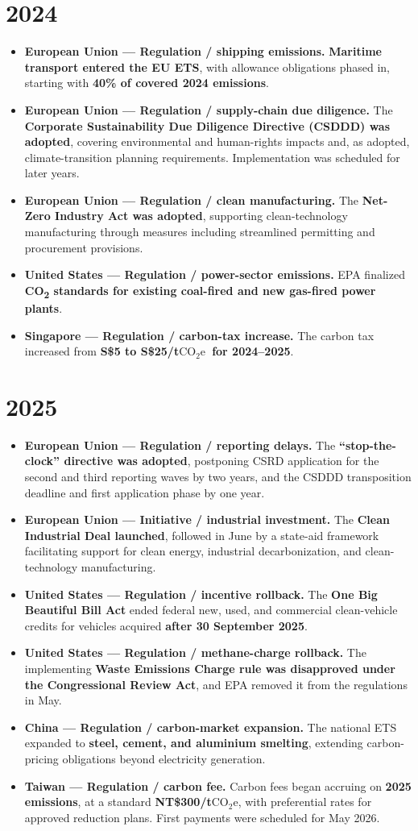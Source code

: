 \documentclass[11pt,a4paper]{article}
\newcommand{\coeq}{\ensuremath{\mathrm{CO}_{2}\mathrm{e}}}
\newcommand{\entry}[3]{\item \textbf{#1 --- #2.} #3}
\begin{document}
\section*{2024}
\begin{itemize}
\entry{European Union}{Regulation / shipping emissions}{\textbf{Maritime transport entered the EU ETS}, with allowance obligations phased in, starting with \textbf{40\% of covered 2024 emissions}.\cite{fit55}}
\entry{European Union}{Regulation / supply-chain due diligence}{The \textbf{Corporate Sustainability Due Diligence Directive (CSDDD) was adopted}, covering environmental and human-rights impacts and, as adopted, climate-transition planning requirements. Implementation was scheduled for later years.\cite{csddd}}
\entry{European Union}{Regulation / clean manufacturing}{The \textbf{Net-Zero Industry Act was adopted}, supporting clean-technology manufacturing through measures including streamlined permitting and procurement provisions.\cite{nzia}}
\entry{United States}{Regulation / power-sector emissions}{EPA finalized \textbf{CO\textsubscript{2} standards for existing coal-fired and new gas-fired power plants}.\cite{power2024}}
\entry{Singapore}{Regulation / carbon-tax increase}{The carbon tax increased from \textbf{S\$5 to S\$25/t\coeq\ for 2024--2025}.\cite{sgtax}}
\end{itemize}

\section*{2025}
\begin{itemize}
\entry{European Union}{Regulation / reporting delays}{The \textbf{``stop-the-clock'' directive was adopted}, postponing CSRD application for the second and third reporting waves by two years, and the CSDDD transposition deadline and first application phase by one year.\cite{stopclock}}
\entry{European Union}{Initiative / industrial investment}{The \textbf{Clean Industrial Deal launched}, followed in June by a state-aid framework facilitating support for clean energy, industrial decarbonization, and clean-technology manufacturing.\cite{cleandeal}}
\entry{United States}{Regulation / incentive rollback}{The \textbf{One Big Beautiful Bill Act} ended federal new, used, and commercial clean-vehicle credits for vehicles acquired \textbf{after 30 September 2025}.\cite{ev2025}}
\entry{United States}{Regulation / methane-charge rollback}{The implementing \textbf{Waste Emissions Charge rule was disapproved under the Congressional Review Act}, and EPA removed it from the regulations in May.\cite{wec}}
\entry{China}{Regulation / carbon-market expansion}{The national ETS expanded to \textbf{steel, cement, and aluminium smelting}, extending carbon-pricing obligations beyond electricity generation.\cite{china2025}}
\entry{Taiwan}{Regulation / carbon fee}{Carbon fees began accruing on \textbf{2025 emissions}, at a standard \textbf{NT\$300/t\coeq}, with preferential rates for approved reduction plans. First payments were scheduled for May 2026.\cite{taiwan}}
\end{itemize}
\end{document}
